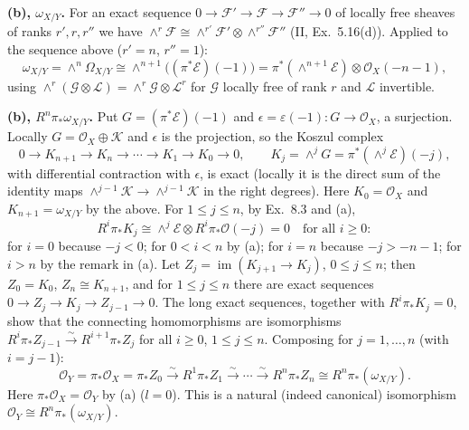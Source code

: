 \documentclass[11pt]{article}
\begin{document}
\textbf{(b), $\omega_{X/Y}$.} For an exact sequence $0\to\mathcal F'\to\mathcal F\to\mathcal F''\to0$ of locally free sheaves of ranks $r',r,r''$ we have $\wedge^r\mathcal F\cong\wedge^{r'}\mathcal F'\otimes\wedge^{r''}\mathcal F''$ (II, Ex.~5.16(d)). Applied to the sequence above ($r'=n$, $r''=1$):
\[
\omega_{X/Y}=\wedge^n\Omega_{X/Y}\cong\wedge^{n+1}\bigl((\pi^*\mathcal E)(-1)\bigr)=\pi^*(\wedge^{n+1}\mathcal E)\otimes\mathcal O_X(-n-1),
\]
using $\wedge^{r}(\mathcal G\otimes\mathcal L)=\wedge^r\mathcal G\otimes\mathcal L^{r}$ for $\mathcal G$ locally free of rank $r$ and $\mathcal L$ invertible.

\textbf{(b), $R^n\pi_*\omega_{X/Y}$.} Put $G=(\pi^*\mathcal E)(-1)$ and $\epsilon=\varepsilon(-1):G\to\mathcal O_X$, a surjection. Locally $G=\mathcal O_X\oplus\mathcal K$ and $\epsilon$ is the projection, so the Koszul complex
\[
0\to K_{n+1}\to K_n\to\cdots\to K_1\to K_0\to0,\qquad K_j=\wedge^jG=\pi^*(\wedge^j\mathcal E)(-j),
\]
with differential contraction with $\epsilon$, is exact (locally it is the direct sum of the identity maps $\wedge^{j-1}\mathcal K\to\wedge^{j-1}\mathcal K$ in the right degrees). Here $K_0=\mathcal O_X$ and $K_{n+1}=\omega_{X/Y}$ by the above. For $1\le j\le n$, by Ex.~8.3 and (a),
\[
R^i\pi_*K_j\cong\wedge^j\mathcal E\otimes R^i\pi_*\mathcal O(-j)=0\quad\text{for all }i\ge0 :
\]
for $i=0$ because $-j<0$; for $0<i<n$ by (a); for $i=n$ because $-j>-n-1$; for $i>n$ by the remark in (a). Let $Z_j=\operatorname{im}(K_{j+1}\to K_j)$, $0\le j\le n$; then $Z_0=K_0$, $Z_n\cong K_{n+1}$, and for $1\le j\le n$ there are exact sequences $0\to Z_j\to K_j\to Z_{j-1}\to0$. The long exact sequences, together with $R^i\pi_*K_j=0$, show that the connecting homomorphisms are isomorphisms $R^{i}\pi_*Z_{j-1}\xrightarrow{\sim}R^{i+1}\pi_*Z_j$ for all $i\ge0$, $1\le j\le n$. Composing for $j=1,\dots,n$ (with $i=j-1$):
\[
\mathcal O_Y=\pi_*\mathcal O_X=\pi_*Z_0\xrightarrow{\sim}R^1\pi_*Z_1\xrightarrow{\sim}\cdots\xrightarrow{\sim}R^n\pi_*Z_n\cong R^n\pi_*(\omega_{X/Y}).
\]
Here $\pi_*\mathcal O_X=\mathcal O_Y$ by (a) ($l=0$). This is a natural (indeed canonical) isomorphism $\mathcal O_Y\cong R^n\pi_*(\omega_{X/Y})$.
\end{document}
